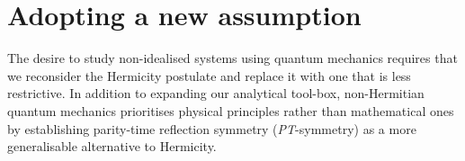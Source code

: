 \documentclass[10pt, a4paper, singlespacing]{report}
\newcommand\PT{\emph{PT}}
\begin{document}
\section{Adopting a new assumption}\label{Assumptions}
The desire to study non-idealised systems using quantum mechanics requires that we reconsider the Hermicity postulate and replace it with one that is less restrictive.
In addition to expanding our analytical tool-box, non-Hermitian quantum mechanics prioritises physical principles rather than mathematical ones by establishing parity-time reflection symmetry (\PT-symmetry) as a more generalisable alternative to Hermicity.

 
\end{document}
